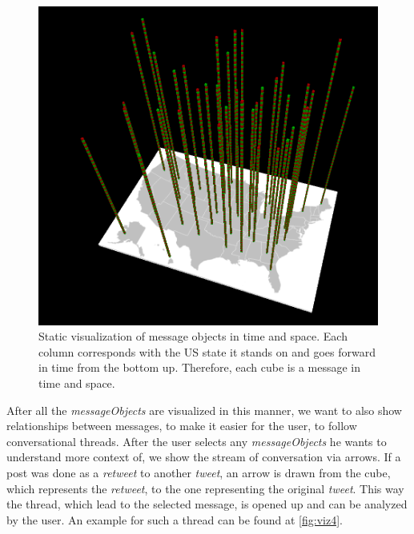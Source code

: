 \begin{figure}
  \includegraphics[width=\linewidth]{figures/viz3.PNG}
  \caption{Static visualization of message objects in time and space. Each column corresponds with the US state it stands on and goes forward in time from the bottom up. Therefore, each cube is a message in time and space.}
  \label{fig:viz2}
\end{figure}
After all the \emph{messageObjects} are visualized in this manner, we want to also show relationships between messages, to make it easier for the user, to follow conversational threads. After the user selects any \emph{messageObjects} he wants to understand more context of, we show the stream of conversation via arrows. If a post was done as a \emph{retweet} to another \emph{tweet}, an arrow is drawn from the cube, which represents the \emph{retweet}, to the one representing the original \emph{tweet}. This way the thread, which lead to the selected message, is opened up and can be analyzed by the user. An example for such a thread can be found at \ref{fig:viz4}.

